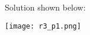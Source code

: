 \documentclass[11pt, letterpaper]{article}
\begin{document}









\begin{solution}{1} 


Solution shown below:\\
\begin{center}
\texttt{[image: r3\_p1.png]}
\end{center}

\end{solution}
\end{document}
